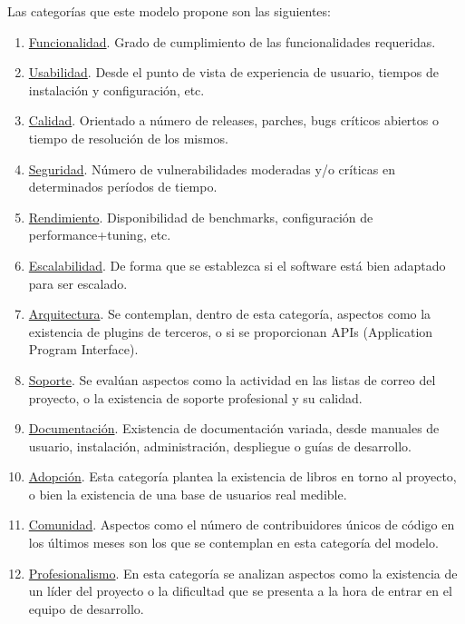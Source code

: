\documentclass[11pt]{article}
\begin{document}
\begin{itemize}
Las categorías que este modelo propone son las siguientes:
\begin{enumerate}
\item{\underline{Funcionalidad}}. Grado de cumplimiento de las funcionalidades requeridas.
\item{\underline{Usabilidad}}. Desde el punto de vista de experiencia de usuario, tiempos de instalación y configuración, etc.
\item{\underline{Calidad}}. Orientado a número de releases, parches, bugs críticos abiertos o tiempo de resolución de los mismos.
\item{\underline{Seguridad}}. Número de vulnerabilidades moderadas y/o críticas en determinados períodos de tiempo.
\item{\underline{Rendimiento}}. Disponibilidad de benchmarks, configuración de performance+tuning, etc.
\item{\underline{Escalabilidad}}. De forma que se establezca si el software está bien adaptado para ser escalado.
\item{\underline{Arquitectura}}. Se contemplan, dentro de esta categoría, aspectos como la existencia de plugins de terceros, o si se proporcionan APIs (Application Program Interface).
\item{\underline{Soporte}}. Se evalúan aspectos como la actividad en las listas de correo del proyecto, o la existencia de soporte profesional y su calidad.
\item{\underline{Documentación}}. Existencia de documentación variada, desde manuales de usuario, instalación, administración, despliegue o guías de desarrollo.
\item{\underline{Adopción}}. Esta categoría plantea la existencia de libros en torno al proyecto, o bien la existencia de una base de usuarios real medible.
\item{\underline{Comunidad}}. Aspectos como el número de contribuidores únicos de código en los últimos meses son los que se contemplan en esta categoría del modelo.
\item{\underline{Profesionalismo}}. En esta categoría se analizan aspectos como la existencia de un líder del proyecto o la dificultad que se presenta a la hora de entrar en el equipo de desarrollo.
\end{enumerate}


\end{itemize}
\end{document}
